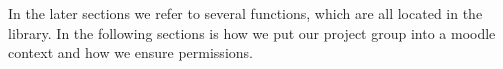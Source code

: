 In the later sections we refer to several functions, which are all located in the library. 
In the following sections is how we put our project group into a moodle context and how we ensure permissions.


\FloatBarrier


\FloatBarrier











